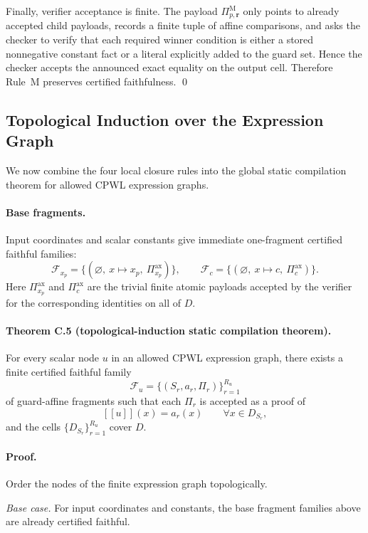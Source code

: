 Finally, verifier acceptance is finite. The payload $\Pi_{p,\mathbf r}^{\mathrm M}$ only points to already accepted child payloads, records a finite tuple of affine comparisons, and asks the checker to verify that each required winner condition is either a stored nonnegative constant fact or a literal explicitly added to the guard set. Hence the checker accepts the announced exact equality on the output cell. Therefore Rule~M preserves certified faithfulness. \qed

\subsection{Topological Induction over the Expression Graph}

We now combine the four local closure rules into the global static compilation theorem for allowed CPWL expression graphs.

\paragraph{Base fragments.}
Input coordinates and scalar constants give immediate one-fragment certified faithful families:
\[
 \mathcal F_{x_p}=\{(\varnothing,\ x\mapsto x_p,\ \Pi_{x_p}^{\mathrm{ax}})\},
 \qquad
 \mathcal F_c=\{(\varnothing,\ x\mapsto c,\ \Pi_c^{\mathrm{ax}})\}.
\]
Here $\Pi_{x_p}^{\mathrm{ax}}$ and $\Pi_c^{\mathrm{ax}}$ are the trivial finite atomic payloads accepted by the verifier for the corresponding identities on all of $D$.

\paragraph{Theorem C.5 (topological-induction static compilation theorem).}
For every scalar node $u$ in an allowed CPWL expression graph, there exists a finite certified faithful family
\[
 \mathcal F_u=\{(S_r,a_r,\Pi_r)\}_{r=1}^{R_u}
\]
of guard-affine fragments such that each $\Pi_r$ is accepted as a proof of
\[
 [[u]](x)=a_r(x)
 \qquad \forall x\in D_{S_r},
\]
and the cells $\{D_{S_r}\}_{r=1}^{R_u}$ cover $D$.

\paragraph{Proof.}
Order the nodes of the finite expression graph topologically.

\emph{Base case.}
For input coordinates and constants, the base fragment families above are already certified faithful.

